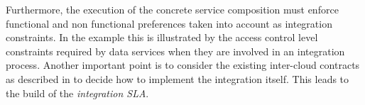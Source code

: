 Furthermore, the execution of the concrete service composition  must enforce functional and non functional preferences taken into account as integration constraints. In the example this is illustrated by  the access control level constraints required by data services when they are involved in an integration process. Another important point is to consider the existing inter-cloud contracts as described in \cite{} to decide how to implement the integration itself. This leads to the build of the \textit{integration SLA}.
 

%
 


